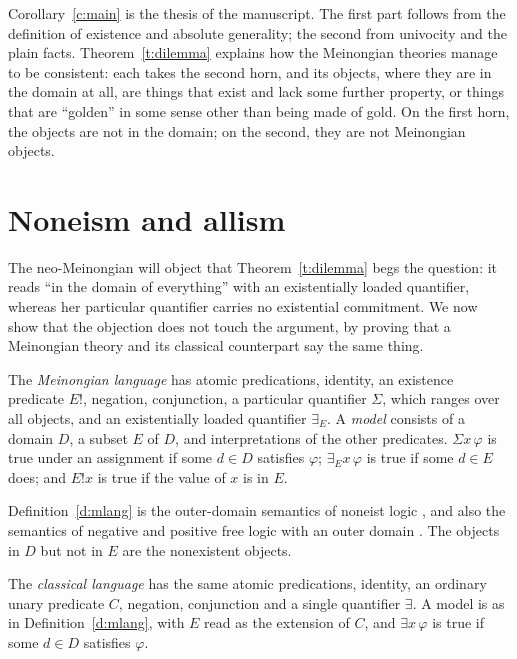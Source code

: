 \documentclass{situationist-preprint}
\begin{document}
Corollary~\ref{c:main} is the thesis of the manuscript. The first part follows from the definition of existence and absolute generality; the second from univocity and the plain facts. Theorem~\ref{t:dilemma} explains how the Meinongian theories manage to be consistent: each takes the second horn, and its objects, where they are in the domain at all, are things that exist and lack some further property, or things that are \enquote{golden} in some sense other than being made of gold. On the first horn, the objects are not in the domain; on the second, they are not Meinongian objects.

\section{Noneism and allism}\label{s:none}

The neo-Meinongian will object that Theorem~\ref{t:dilemma} begs the question: it reads \enquote{in the domain of everything} with an existentially loaded quantifier, whereas her particular quantifier carries no existential commitment. We now show that the objection does not touch the argument, by proving that a Meinongian theory and its classical counterpart say the same thing.

\begin{definition}\label{d:mlang}
The \emph{Meinongian language} has atomic predications, identity, an existence predicate $E!$, negation, conjunction, a particular quantifier $\Sigma$, which ranges over all objects, and an existentially loaded quantifier $\exists_E$. A \emph{model} consists of a domain $D$, a subset $E$ of $D$, and interpretations of the other predicates. $\Sigma x\, \varphi$ is true under an assignment if some $d \in D$ satisfies $\varphi$; $\exists_E x\, \varphi$ is true if some $d \in E$ does; and $E!x$ is true if the value of $x$ is in $E$.
\end{definition}

Definition~\ref{d:mlang} is the outer-domain semantics of noneist logic \citep{Routley1980,Priest2005}, and also the semantics of negative and positive free logic with an outer domain \citep{Lambert2003}. The objects in $D$ but not in $E$ are the nonexistent objects.

\begin{definition}\label{d:clang}
The \emph{classical language} has the same atomic predications, identity, an ordinary unary predicate $C$, negation, conjunction and a single quantifier $\exists$. A model is as in Definition~\ref{d:mlang}, with $E$ read as the extension of $C$, and $\exists x\, \varphi$ is true if some $d \in D$ satisfies $\varphi$.
\end{definition}
\end{document}
